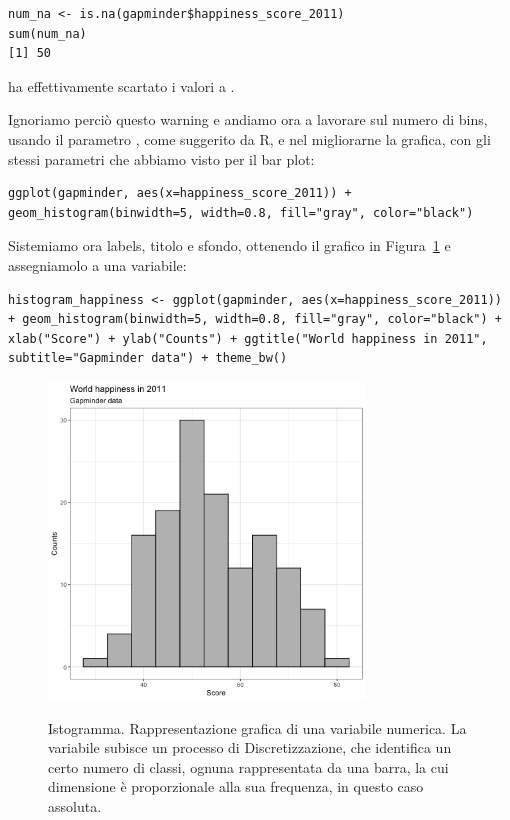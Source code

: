 \begin{lstlisting}[style=Rstyle]
num_na <- is.na(gapminder$happiness_score_2011)
sum(num_na)
[1] 50
\end{lstlisting}
%
 ha effettivamente scartato i valori a .

\noindent Ignoriamo perci\`o questo warning e andiamo ora a lavorare sul numero di bins, usando il parametro , come suggerito da R, e nel migliorarne la grafica, con gli stessi parametri che abbiamo visto per il bar plot:

\begin{lstlisting}[style=Rstylescript]
ggplot(gapminder, aes(x=happiness_score_2011)) + geom_histogram(binwidth=5, width=0.8, fill="gray", color="black")
\end{lstlisting}
%
Sistemiamo ora labels, titolo e sfondo, ottenendo il grafico in Figura~\ref{fig:histogram} e assegniamolo a una variabile:

\begin{lstlisting}[style=Rstylescript]
histogram_happiness <- ggplot(gapminder, aes(x=happiness_score_2011)) + geom_histogram(binwidth=5, width=0.8, fill="gray", color="black") + xlab("Score") + ylab("Counts") + ggtitle("World happiness in 2011", subtitle="Gapminder data") + theme_bw()
\end{lstlisting}


\begin{figure}[h]
 \centering
  \includegraphics[width=0.75\textwidth]{images/histogram.png}
  \label{fig:histogram}
 \caption{Istogramma. Rappresentazione grafica di una variabile numerica. La variabile subisce un processo di Discretizzazione, che identifica un certo numero di classi, ognuna rappresentata da una barra, la cui dimensione \`e proporzionale alla sua frequenza, in questo caso assoluta.}
\end{figure}

